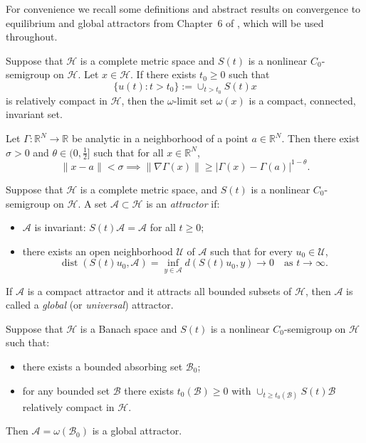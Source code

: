 \documentclass[reqno]{amsart}
\begin{document}
For convenience we recall some definitions and abstract results on convergence
to equilibrium and global attractors from Chapter~6 of \cite{Songu}, which will be
used throughout.

\begin{corollary}  \label{2.2}
Suppose that $\mathcal{H}$ is a complete metric space and $S(t)$ is a nonlinear
$C_0$-semigroup on $\mathcal{H}$. Let $x \in \mathcal{H}$. If there exists $t_0 \ge 0$
such that
\[
\{ u(t) : t > t_0 \} := \cup_{t > t_0} S(t) x
\]
is relatively compact in $\mathcal{H}$, then the $\omega$-limit set $\omega(x)$ is a
compact, connected, invariant set.
\end{corollary}

\begin{theorem}\cite{Songu}
Let $\Gamma : \mathbb{R}^N \to \mathbb{R}$ be analytic in a neighborhood of a point
$a \in \mathbb{R}^N$. Then there exist $\sigma > 0$ and $\theta \in (0, \tfrac12]$
such that for all $x \in \mathbb{R}^N$,
\[
\|x - a\| < \sigma \implies  \|\nabla \Gamma(x)\| \ge |\Gamma(x)
- \Gamma(a)|^{1 - \theta}.
\]
\end{theorem}

\begin{definition} \rm
Suppose that $\mathcal{H}$ is a complete metric space, and $S(t)$ is a nonlinear
 $C_0$-semigroup on $\mathcal{H}$. A set $\mathcal{A} \subset \mathcal{H}$ is an
 \emph{attractor} if:
\begin{itemize}
\item[(i)] $\mathcal{A}$ is invariant: $S(t)\mathcal{A} = \mathcal{A}$ for all
$t \ge 0$;
\item[(ii)] there exists an open neighborhood $\mathcal{U}$ of $\mathcal{A}$ such
that for every $u_0 \in \mathcal{U}$,
\[
\operatorname{dist} \left( S(t) u_0, \mathcal{A} \right) = \inf_{y \in \mathcal{A}}
d \left( S(t) u_0, y \right) \longrightarrow 0 \quad \text{as } t \to \infty.
\]
\end{itemize}
\end{definition}

\begin{definition} \rm
If $\mathcal{A}$ is a compact attractor and it attracts all bounded subsets of
$\mathcal{H}$, then $\mathcal{A}$ is called a \emph{global} (or \emph{universal})
attractor.
\end{definition}

\begin{theorem} \label{attractor}
Suppose that $\mathcal{H}$ is a Banach space and $S(t)$ is a nonlinear $C_0$-semigroup
on $\mathcal{H}$ such that:
\begin{itemize}
\item[(i)] there exists a bounded absorbing set $\mathcal{B}_0$;
\item[(ii)] for any bounded set $\mathcal{B}$ there exists $t_0(\mathcal{B}) \ge 0$
with
$\cup_{t \ge t_0(\mathcal{B})} S(t) \mathcal{B}$
relatively compact in $\mathcal{H}$.
\end{itemize}
Then $\mathcal{A} = \omega(\mathcal{B}_0)$ is a global attractor.
\end{theorem}
\end{document}
